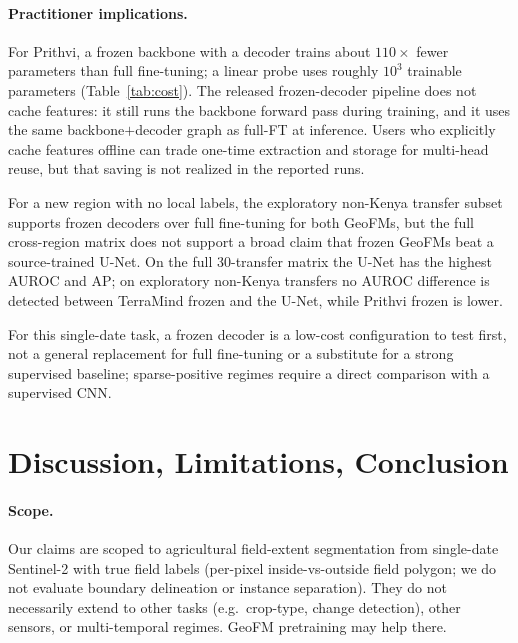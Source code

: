\documentclass{article}
\begin{document}
\paragraph{Practitioner implications.} For Prithvi, a frozen backbone with a decoder
trains about $110\times$ fewer parameters than full fine-tuning; a linear probe
uses roughly $10^3$ trainable parameters (Table~\ref{tab:cost}). The released frozen-decoder pipeline does not
cache features: it still runs the backbone forward pass during training, and it uses
the same backbone$+$decoder graph as full-FT at inference. Users who explicitly cache
features offline can trade one-time extraction and storage for multi-head reuse, but
that saving is not realized in the reported runs.

For a new region with no local labels, the exploratory non-Kenya transfer subset
supports frozen decoders over full fine-tuning for both GeoFMs, but the full
cross-region matrix does not support a broad claim
that frozen GeoFMs beat a source-trained U-Net. On the full 30-transfer matrix the
U-Net has the highest AUROC and AP; on exploratory non-Kenya transfers no AUROC
difference is detected between TerraMind frozen and the U-Net, while Prithvi frozen is lower.

For this
single-date task, a frozen decoder is a low-cost configuration to test first, not
a general replacement for full fine-tuning or a substitute for a strong
supervised baseline; sparse-positive regimes require a direct comparison with a
supervised CNN.

\FloatBarrier
\section{Discussion, Limitations, Conclusion}
\label{sec:disc}
\paragraph{Scope.} Our claims are scoped to agricultural field-extent segmentation
from single-date Sentinel-2 with true field labels (per-pixel inside-vs-outside
field polygon; we do not evaluate boundary delineation or instance separation). They do not necessarily extend to
other tasks (e.g.\ crop-type, change detection), other sensors, or multi-temporal
regimes. GeoFM pretraining may help there.
\end{document}
